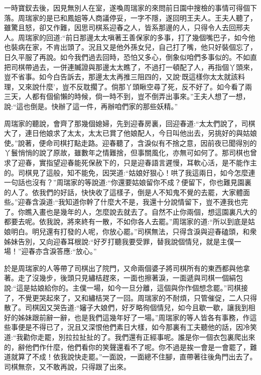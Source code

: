 \begin{parag}
    一時寶釵去後，因見無別人在室，遂喚周瑞家的來問前日園中搜檢的事情可得個下落。周瑞家的是已和鳳姐等人商議停妥，一字不隱，遂回明王夫人。王夫人聽了，雖驚且怒，卻又作難，因思司棋系迎春之人，皆系那邊的人，只得令人去回邢夫人。周瑞家的回道:“前日那邊太太嗔著王善保家的多事，打了幾個嘴巴子，如今他也裝病在家，不肯出頭了。況且又是他外孫女兒，自己打了嘴，他只好裝個忘了，日久平服了再說。如今我們過去回時，恐怕又多心，倒象似咱們多事似的。不如直把司棋帶過去，一併連贓證與那邊太太瞧了，不過打一頓配了人，再指個丫頭來，豈不省事。如今白告訴去，那邊太太再推三阻四的，又說‘既這樣你太太就該料理，又來說什麼’，豈不反耽擱了。倘那丫頭瞅空尋了死，反不好了。如今看了兩三天，人都有個偷懶的時候，倘一時不到，豈不倒弄出事來。”王夫人想了一想，說:“這也倒是。快辦了這一件，再辦咱們家的那些妖精。”
\end{parag}


\begin{parag}
    周瑞家的聽說，會齊了那幾個媳婦，先到迎春房裏，回迎春道:“太太們說了，司棋大了，連日他娘求了太太，太太已賞了他娘配人，今日叫他出去，另挑好的與姑娘使。”說著，便命司棋打點走路。迎春聽了，含淚似有不捨之意，因前夜已聞得別的丫鬟悄悄的說了原故，雖數年之情難捨，但事關風化，亦無可如何了。那司棋也曾求了迎春，實指望迎春能死保赦下的，只是迎春語言遲慢，耳軟心活，是不能作主的。司棋見了這般，知不能免，因哭道:“姑娘好狠心！哄了我這兩日，如今怎麼連一句話也沒有？”周瑞家的等說道:“你還要姑娘留你不成？便留下，你也難見園裏的人了。依我們的好話，快快收了這樣子，倒是人不知鬼不覺的去罷，大家體面些。”迎春含淚道:“我知道你幹了什麼大不是，我還十分說情留下，豈不連我也完了。你瞧入畫也是幾年的人，怎麼說去就去了。自然不止你兩個，想這園裏凡大的都要去呢。依我說，將來終有一散，不如你各人去罷。”周瑞家的道:“所以到底是姑娘明白。明兒還有打發的人呢，你放心罷。”司棋無法，只得含淚與迎春磕頭，和衆姊妹告別，又向迎春耳根說:“好歹打聽我要受罪，替我說個情兒，就是主僕一場！”迎春亦含淚答應:“放心。”
\end{parag}


\begin{parag}
    於是周瑞家的人等帶了司棋出了院門，又命兩個婆子將司棋所有的東西都與他拿著。走了沒幾步，後頭只見繡桔趕來，一面也擦著淚，一面遞與司棋一個絹包說:“這是姑娘給你的。主僕一場，如今一旦分離，這個與你作個想念罷。”司棋接了，不覺更哭起來了，又和繡桔哭了一回。周瑞家的不耐煩，只管催促，二人只得散了。司棋因又哭告道:“嬸子大娘們，好歹略徇個情兒，如今且歇一歇，讓我到相好的姊妹跟前辭一辭，也是我們這幾年好了一場。”周瑞家的等人皆各有事務，作這些事便是不得已了，況且又深恨他們素日大樣，如今那裏有工夫聽他的話，因冷笑道:“我勸你走罷，別拉拉扯扯的了。我們還有正經事呢。誰是你一個衣包裏爬出來的，辭他們作什麼，他們看你的笑聲還看不了呢。你不過是挨一會是一會罷了，難道就算了不成！依我說快走罷。”一面說，一面總不住腳，直帶著往後角門出去了。司棋無奈，又不敢再說，只得跟了出來。
\end{parag}


